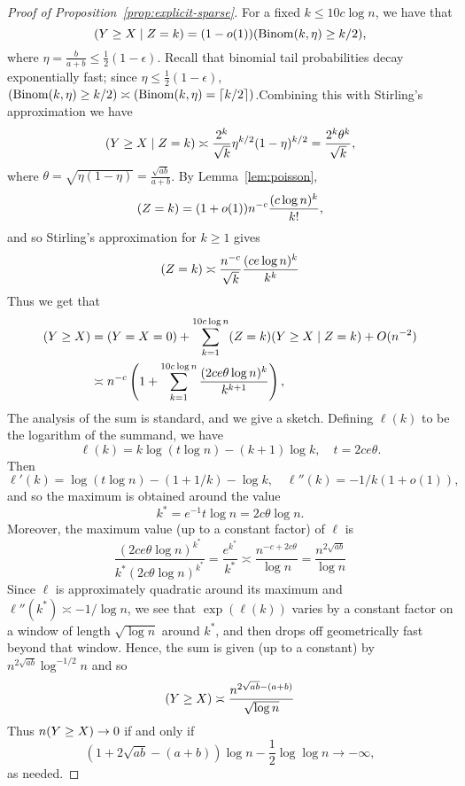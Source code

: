 \documentclass[EJP]{ejpecp}
\newcommand{\1}[1]{\mathbbm{1}_{\{#1\}}}
\newcommand{\eps}{\epsilon}
\let\Pr\relax
\DeclareMathOperator{\Pr}{Pr}
\DeclareMathOperator{\Binom}{Binom}
\begin{document}
\begin{proof}[Proof of Proposition~\ref{prop:explicit-sparse}]
For a fixed $k \leq 10 c \log n$, we have that
\[
\Pr(Y \geq X \mid Z = k) = (1-o(1)) \Pr(\Binom(k,\eta) \geq k/2),
\]
where $\eta = \frac{b}{a+b} \le \frac 12 (1-\eps)$.
Recall that binomial tail probabilities decay exponentially fast; since $\eta \le \frac 12 (1-\eps)$,
$\Pr(\Binom(k,\eta) \ge k/2) \asymp \Pr(\Binom(k,\eta) = \lceil k/2 \rceil)$.Combining this
with Stirling's approximation we have
\[
\Pr(Y \geq X \mid Z = k) \asymp \frac{2^k}{\sqrt{k}} \eta^{k/2}(1-\eta)^{k/2} = \frac{2^k \theta^k}{\sqrt{k}},
\]
where $\theta = \sqrt{\eta(1-\eta)} = \frac{\sqrt{a b}}{a+b}$.
By Lemma~\ref{lem:poisson},
\[
\Pr(Z = k) = (1+o(1)) n^{-c} \frac{(c \log n)^k}{k!},
\]
and so Stirling's approximation for $k \ge 1$ gives
\[
\Pr(Z = k) \asymp \frac{n^{-c}}{\sqrt{k}} \frac{(c e \log n)^k}{k^k}
\]
Thus we get that
\begin{align*}
\Pr(Y \geq X) &= \Pr(Y = X = 0) + \sum_{k=1}^{10 c \log n} \Pr(Z = k) \Pr(Y \geq X \mid Z = k) +
O(n^{-2}) \\
& \asymp n^{-c} \left( 1+ \sum_{k=1}^{10 c \log n} \frac{(2 c e \theta \log n)^k}{k^{k+1}} \right),
\end{align*}
The analysis of the sum is standard, and we give a sketch. Defining $\ell(k)$ to be the
logarithm of the summand, we have
\[
\ell(k) = k \log (t \log n) - (k+1) \log k, \quad t = 2 c e \theta.
\]
Then
\[
\ell'(k) = \log (t \log n) - (1+1/k) - \log k, \quad \ell''(k) = -1/k(1+o(1)),
\]
and so the maximum is obtained around the value
\[
k^{\ast} = e^{-1} t \log n = 2 c \theta \log n.
\]
Moreover, the maximum value (up to a constant factor) of $\ell$ is
\[
\frac{(2 c e \theta \log n)^{k^{\ast}}}{k^\ast (2 c \theta \log n)^{k^{\ast}}} =
\frac{e^{k^{\ast}}}{k^{\ast}} \asymp \frac{n^{-c + 2c \theta}}{\log n} =
\frac{n^{2\sqrt{ab}}}{\log n}
\]
Since $\ell$ is approximately quadratic around its maximum and $\ell''(k^\ast) \asymp -1/\log n$,
we see that $\exp(\ell(k))$ varies by a constant factor on a window of length $\sqrt{\log n}$
around $k^\ast$, and then drops off geometrically fast beyond that window. Hence, the sum
is given (up to a constant) by $n^{2\sqrt{ab}} \log^{-1/2} n$
and so
\[
  \Pr(Y \ge X) \asymp
  \frac{n^{2\sqrt{ab} - (a+b)}}{\sqrt{\log n}}
\]
Thus $n \Pr(Y \geq X) \to 0$ if and only if
\[
(1+2 \sqrt{ab}-(a+b))\log n - \frac 12 \log \log n \to -\infty,
\]
as needed.
\end{proof}
\end{document}
